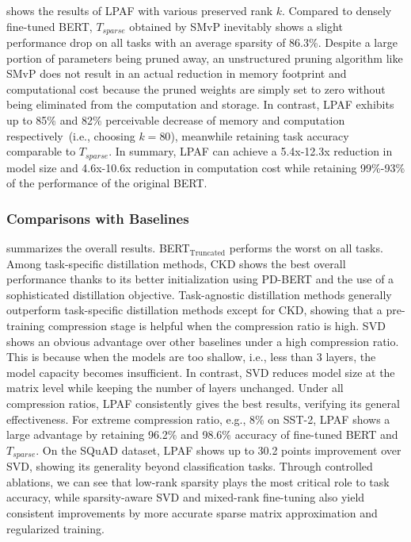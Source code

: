  shows the results of LPAF with various preserved rank $k$. 
Compared to densely fine-tuned BERT, $T_{sparse}$ obtained by SMvP inevitably shows a slight performance drop 
on all tasks with an average sparsity of 86.3\%. Despite a large portion of parameters being pruned away, an unstructured pruning algorithm like SMvP does not result in an actual reduction in memory footprint and computational cost because the pruned weights are simply set to zero without being eliminated from the computation and storage. In contrast, LPAF exhibits up to 85\% and 82\% perceivable decrease of memory and computation respectively~(i.e., choosing $k=80$), meanwhile retaining task accuracy comparable to $T_{sparse}$. In summary, LPAF can achieve 
a 5.4x-12.3x reduction in model size and 4.6x-10.6x reduction in 
computation cost  while 
retaining 99\%-93\% of the performance of the original BERT.


\subsubsection{Comparisons with Baselines}
 summarizes the overall results. BERT$_{\text{Truncated}}$ performs the worst on all tasks. Among task-specific distillation methods, CKD shows the best overall performance thanks to its better initialization using PD-BERT and the use of a sophisticated distillation objective. Task-agnostic distillation methods generally outperform task-specific distillation methods except for CKD, showing that a pre-training compression stage is helpful when the compression ratio is high. SVD shows an obvious advantage over other baselines under a high compression ratio. This is because when the models are too shallow, i.e.,  less than 3 layers, the model capacity becomes insufficient. In contrast, SVD reduces model size at the matrix level while keeping the number of layers unchanged. Under all compression ratios, LPAF consistently gives the best results, verifying its general effectiveness. For extreme compression ratio, 
e.g., 8\%  on SST-2, LPAF shows a large advantage by retaining 96.2\% and 98.6\% accuracy of fine-tuned BERT and $T_{sparse}$. On the SQuAD dataset, LPAF shows up to 30.2 points improvement over SVD, showing its generality beyond classification tasks. Through controlled ablations, we can see that low-rank sparsity plays the most critical role to task accuracy, while sparsity-aware SVD and mixed-rank fine-tuning also yield consistent improvements by more accurate sparse matrix approximation and regularized training.





